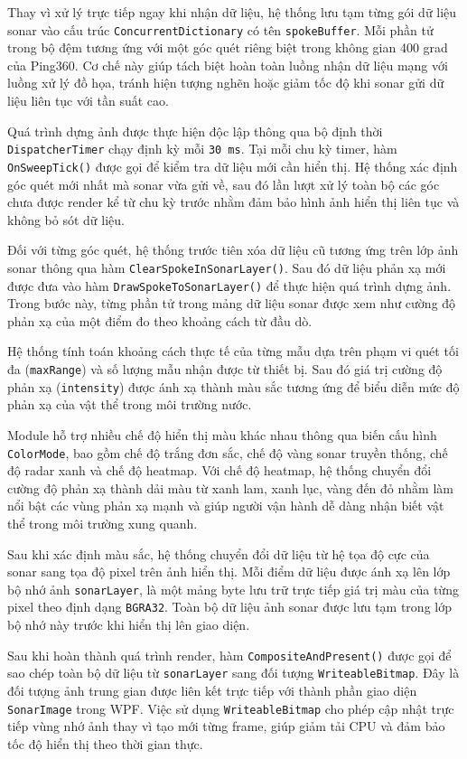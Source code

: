 \documentclass[../DoAn.tex]{subfiles}
\begin{document}
Thay vì xử lý trực tiếp ngay khi nhận dữ liệu, hệ thống lưu tạm từng gói dữ liệu sonar vào cấu trúc \texttt{ConcurrentDictionary} có tên \texttt{spokeBuffer}. Mỗi phần tử trong bộ đệm tương ứng với một góc quét riêng biệt trong không gian 400 grad của Ping360. Cơ chế này giúp tách biệt hoàn toàn luồng nhận dữ liệu mạng với luồng xử lý đồ họa, tránh hiện tượng nghẽn hoặc giảm tốc độ khi sonar gửi dữ liệu liên tục với tần suất cao.

Quá trình dựng ảnh được thực hiện độc lập thông qua bộ định thời \texttt{DispatcherTimer} chạy định kỳ mỗi \texttt{30\,ms}. Tại mỗi chu kỳ timer, hàm \texttt{OnSweepTick()} được gọi để kiểm tra dữ liệu mới cần hiển thị. Hệ thống xác định góc quét mới nhất mà sonar vừa gửi về, sau đó lần lượt xử lý toàn bộ các góc chưa được render kể từ chu kỳ trước nhằm đảm bảo hình ảnh hiển thị liên tục và không bỏ sót dữ liệu.

Đối với từng góc quét, hệ thống trước tiên xóa dữ liệu cũ tương ứng trên lớp ảnh sonar thông qua hàm \texttt{ClearSpokeInSonarLayer()}. Sau đó dữ liệu phản xạ mới được đưa vào hàm \texttt{DrawSpokeToSonarLayer()} để thực hiện quá trình dựng ảnh. Trong bước này, từng phần tử trong mảng dữ liệu sonar được xem như cường độ phản xạ của một điểm đo theo khoảng cách từ đầu dò.

Hệ thống tính toán khoảng cách thực tế của từng mẫu dựa trên phạm vi quét tối đa (\texttt{maxRange}) và số lượng mẫu nhận được từ thiết bị. Sau đó giá trị cường độ phản xạ (\texttt{intensity}) được ánh xạ thành màu sắc tương ứng để biểu diễn mức độ phản xạ của vật thể trong môi trường nước.

Module hỗ trợ nhiều chế độ hiển thị màu khác nhau thông qua biến cấu hình \texttt{ColorMode}, bao gồm chế độ trắng đơn sắc, chế độ vàng sonar truyền thống, chế độ radar xanh và chế độ heatmap. Với chế độ heatmap, hệ thống chuyển đổi cường độ phản xạ thành dải màu từ xanh lam, xanh lục, vàng đến đỏ nhằm làm nổi bật các vùng phản xạ mạnh và giúp người vận hành dễ dàng nhận biết vật thể trong môi trường xung quanh.

Sau khi xác định màu sắc, hệ thống chuyển đổi dữ liệu từ hệ tọa độ cực của sonar sang tọa độ pixel trên ảnh hiển thị. Mỗi điểm dữ liệu được ánh xạ lên lớp bộ nhớ ảnh \texttt{sonarLayer}, là một mảng byte lưu trữ trực tiếp giá trị màu của từng pixel theo định dạng \texttt{BGRA32}. Toàn bộ dữ liệu ảnh sonar được lưu tạm trong lớp bộ nhớ này trước khi hiển thị lên giao diện.

Sau khi hoàn thành quá trình render, hàm \texttt{CompositeAndPresent()} được gọi để sao chép toàn bộ dữ liệu từ \texttt{sonarLayer} sang đối tượng \texttt{WriteableBitmap}. Đây là đối tượng ảnh trung gian được liên kết trực tiếp với thành phần giao diện \texttt{SonarImage} trong WPF. Việc sử dụng \texttt{WriteableBitmap} cho phép cập nhật trực tiếp vùng nhớ ảnh thay vì tạo mới từng frame, giúp giảm tải CPU và đảm bảo tốc độ hiển thị theo thời gian thực.
\end{document}
